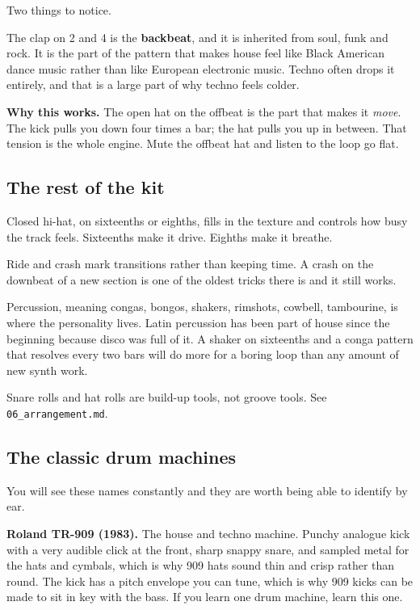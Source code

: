 Two things to notice.

The clap on 2 and 4 is the \textbf{backbeat}, and it is inherited from soul, funk and rock. It is
the part of the pattern that makes house feel like Black American dance music rather than
like European electronic music. Techno often drops it entirely, and that is a large part of
why techno feels colder.

\begin{intuitionbox}
\textbf{Why this works.} The open hat on the offbeat is the part that makes it \emph{move}. The kick
pulls you down four times a bar; the hat pulls you up in between. That tension is the whole
engine. Mute the offbeat hat and listen to the loop go flat.
\end{intuitionbox}

\subsection{The rest of the kit}\label{th03_rhythm-the-rest-of-the-kit}

Closed hi-hat, on sixteenths or eighths, fills in the texture and controls how busy the
track feels. Sixteenths make it drive. Eighths make it breathe.

Ride and crash mark transitions rather than keeping time. A crash on the downbeat of a new
section is one of the oldest tricks there is and it still works.

Percussion, meaning congas, bongos, shakers, rimshots, cowbell, tambourine, is where the
personality lives. Latin percussion has been part of house since the beginning because
disco was full of it. A shaker on sixteenths and a conga pattern that resolves every two
bars will do more for a boring loop than any amount of new synth work.

Snare rolls and hat rolls are build-up tools, not groove tools. See \texttt{06\_arrangement.md}.

\subsection{The classic drum machines}\label{th03_rhythm-the-classic-drum-machines}

You will see these names constantly and they are worth being able to identify by ear.

\textbf{Roland TR-909 (1983).} The house and techno machine. Punchy analogue kick with a very
audible click at the front, sharp snappy snare, and sampled metal for the hats and cymbals,
which is why 909 hats sound thin and crisp rather than round. The kick has a pitch envelope
you can tune, which is why 909 kicks can be made to sit in key with the bass. If you learn
one drum machine, learn this one.

